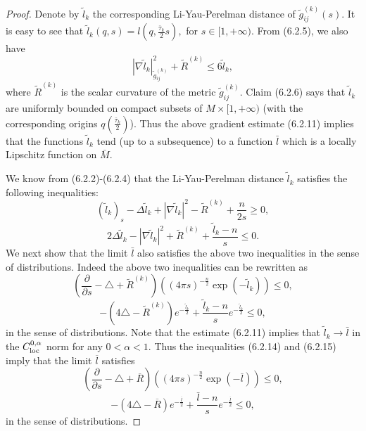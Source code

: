 \begin{proof}
Denote by $\tilde{l}_k$ the corresponding Li-Yau-Perelman distance
of $\tilde{g}_{ij}^{(k)}(s)$. It is easy to see that
$\tilde{l}_k(q,s)=l(q,\frac{\bar{\tau}_k}{2}s),$ for $s\in
[1,+\infty).$ From (6.2.5), we also have \begin{equation} |\nabla
\tilde{l}_k|^2_{\tilde{g}_{ij}^{(k)}}+\tilde{R}^{(k)} \leq
6\tilde{l}_k,
\end{equation} where $\tilde{R}^{(k)}$ is the scalar curvature of the metric
$\tilde{g}_{ij}^{(k)}$. Claim (6.2.6) says that $\tilde{l}_k$ are
uniformly bounded on compact subsets of $M \times [1,+\infty)$
(with the corresponding origins $q(\frac{\bar{\tau}_k}{2})$). Thus
the above gradient estimate (6.2.11) implies that the functions
$\tilde{l}_k$ tend (up to a subsequence) to a function $\bar{l}$
which is a locally Lipschitz function on $\bar{M}$.

We know from (6.2.2)-(6.2.4) that the Li-Yau-Perelman distance
$\tilde{l}_k$ satisfies the following inequalities: \begin{equation}
(\tilde{l}_k)_s-\Delta
\tilde{l}_k+|\nabla\tilde{l}_k|^2-\tilde{R}^{(k)}
+\frac{n}{2s}\geq 0, %
\end{equation} \begin{equation} 2\Delta\tilde{l}_k-|\nabla\tilde{l}_k|^2
+\tilde{R}^{(k)}+\frac{\tilde{l}_k-n}{s}\leq 0. %
\end{equation} We next show that the limit $\bar{l}$ also satisfies the above
two inequalities in the sense of distributions. Indeed the above
two inequalities can be rewritten as \begin{equation}
\left(\frac{\partial}{\partial s}-\triangle+\widetilde{R}^{(k)}\right)
\left((4\pi s)^{-\frac{n}{2}}\exp(-\tilde{l}_k)\right)\leq 0,
\end{equation} \begin{equation} -(4\triangle
-\widetilde{R}^{(k)})e^{-\frac{\tilde{l}_k}{2}}
+\frac{\tilde{l}_{k}-n}{s}e^{-\frac{\tilde{l}_k}{2}}\leq 0,
\end{equation} in the sense of distributions. Note that the estimate (6.2.11)
implies that $\tilde{l}_k\rightarrow \bar{l}$ in the $C_{\rm
loc}^{0,\alpha}$ norm for any $0<\alpha<1.$ Thus the inequalities
(6.2.14) and (6.2.15) imply that the limit $\overline{l}$
satisfies \begin{equation} \left(\frac{\partial}{\partial s}-\triangle
+\overline{R}\right) \left((4\pi s)^{-\frac{n}{2}}\exp(-\overline{l})\right)\leq
0,
\end{equation} \begin{equation} -(4\triangle-\overline{R})e^{-\frac{\overline{l}}{2}}
+\frac{\bar{l}-n}{s}e^{-\frac{\overline{l}}{2}}\leq 0,
\end{equation} in the sense of distributions.


\end{proof}
